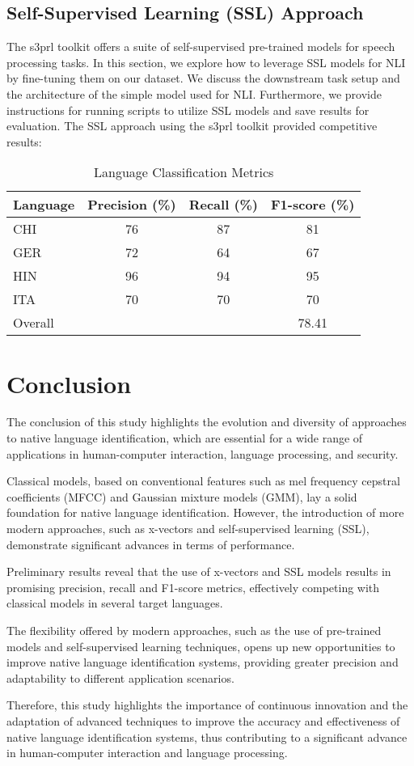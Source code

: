 \documentclass{Interspeech2024}
\begin{document}
\subsection{Self-Supervised Learning (SSL) Approach}
The s3prl toolkit offers a suite of self-supervised pre-trained models for speech processing tasks. In this section, we explore how to leverage SSL models for NLI by fine-tuning them on our dataset. We discuss the downstream task setup and the architecture of the simple model used for NLI. Furthermore, we provide instructions for running scripts to utilize SSL models and save results for evaluation.
The SSL approach using the s3prl toolkit provided competitive results:
\begin{table}[htbp]
  \centering
  \caption{Language Classification Metrics}
    \begin{tabular}{lccc}
    \toprule
    Language & Precision (\%) & Recall (\%) & F1-score (\%) \\
    \midrule
    CHI   & 76 & 87 & 81 \\
    GER   & 72 & 64 & 67 \\
    HIN   & 96 & 94 & 95 \\
    ITA   & 70 & 70 & 70 \\
    \midrule
    Overall & & & 78.41 \\
    \bottomrule
    \end{tabular}%
  \label{tab:metrics}%
\end{table}%

\section{Conclusion}
The conclusion of this study highlights the evolution and diversity of approaches to native language identification, which are essential for a wide range of applications in human-computer interaction, language processing, and security.

Classical models, based on conventional features such as mel frequency cepstral coefficients (MFCC) and Gaussian mixture models (GMM), lay a solid foundation for native language identification. However, the introduction of more modern approaches, such as x-vectors and self-supervised learning (SSL), demonstrate significant advances in terms of performance.

Preliminary results reveal that the use of x-vectors and SSL models results in promising precision, recall and F1-score metrics, effectively competing with classical models in several target languages.

The flexibility offered by modern approaches, such as the use of pre-trained models and self-supervised learning techniques, opens up new opportunities to improve native language identification systems, providing greater precision and adaptability to different application scenarios.

Therefore, this study highlights the importance of continuous innovation and the adaptation of advanced techniques to improve the accuracy and effectiveness of native language identification systems, thus contributing to a significant advance in human-computer interaction and language processing.
\end{document}

